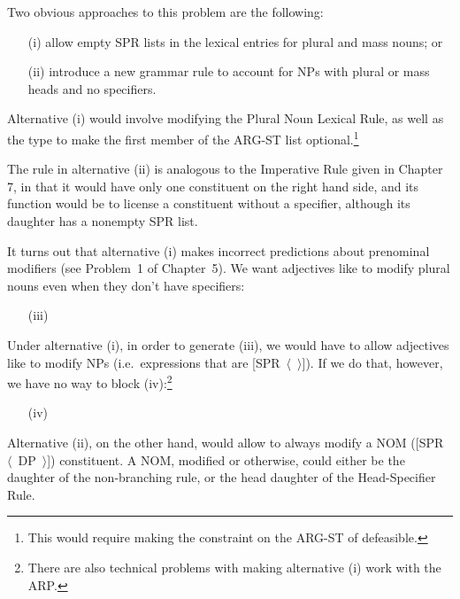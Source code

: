 \documentclass[a4paper,landscape,headrule,footrule]{foils}
\begin{document}
\newpage
Two  obvious approaches to this problem are the following:
\begin{itemize}
\item[(i)] allow empty SPR lists in the lexical entries for plural
and mass nouns; or 
\item[(ii)] introduce a new  grammar rule to account for NPs with
plural or mass heads and no specifiers.
\end{itemize}

\noindent
Alternative (i) would involve modifying the Plural Noun Lexical Rule,
as well as the type  to make the first member of
the ARG-ST list optional.\footnote{This would require making the
constraint on the ARG-ST of  defeasible.}

The rule in alternative (ii) is analogous to the  Imperative Rule given in Chapter 7, in that it would have only
one constituent on the right hand side, and its function would be to
license a constituent without a specifier, although its daughter has a
nonempty SPR list.

It turns out that alternative (i) makes incorrect predictions about
prenominal modifiers (see Problem~1 of Chapter~5).  We want adjectives
like  to modify plural nouns even when they don't have
specifiers:

\begin{itemize}
\item[(iii)] 
\end{itemize}

\noindent
Under alternative (i), in order to generate (iii), we would have
to allow adjectives like  to modify NPs (i.e.\ expressions
that are \mbox{[SPR $\langle$  $\rangle$]}).  If we do that, however, we have no
way to block (iv):\footnote{There are also technical problems with
making alternative (i) work with the ARP.}

\begin{itemize}
\item[(iv)] 
\end{itemize}

\newpage
Alternative (ii), on the other hand, would allow 
to always modify a NOM \mbox{([SPR $\langle$ DP $\rangle$])}
constituent.  A NOM, modified or otherwise, could either be
the daughter of the non-branching rule, or the head daughter of
the Head-Specifier Rule.
\end{document}
